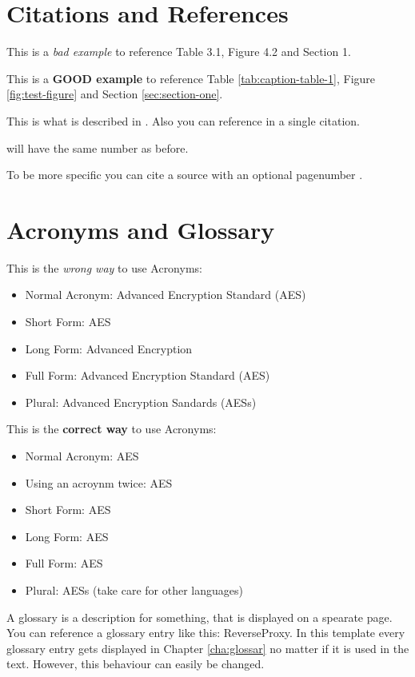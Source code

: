 \chapter{Citations and References}
\label{cha:citations-and-references}

This is a \textit{bad example} to reference Table 3.1, Figure 4.2 and Section 1.

This is a \textbf{GOOD example} to reference Table \ref{tab:caption-table-1}, Figure \ref{fig:test-figure} and Section \ref{sec:section-one}.

This is what is described in \cite{7516158}. Also you can reference \cite{siriwardena_advanced_2014, levin_restful_2016} in a single citation. 

\cite{7516158} will have the same number as before.

To be more specific you can cite a source with an optional pagenumber \cite[p. 17]{rfc:6838}.

\chapter{Acronyms and Glossary}
\label{sec:acronyms-and-glossary}

This is the \textit{wrong way} to use Acronyms: 
\begin{itemize}
    \item Normal Acronym: Advanced Encryption Standard (AES)
    \item Short Form: AES
    \item Long Form: Advanced Encryption
    \item Full Form: Advanced Encryption Standard (AES)
    \item Plural: Advanced Encryption Sandards (AESs)
\end{itemize}

This is the \textbf{correct way} to use Acronyms: 
\begin{itemize}
    \item Normal Acronym: \ac{AES}
    \item Using an acroynm twice: \ac{AES}
    \item Short Form: \acs{AES}
    \item Long Form: \acl{AES}
    \item Full Form: \acf{AES}
    \item Plural: \acfp{AES} (take care for other languages)
\end{itemize}

A glossary is a description for something, that is displayed on a spearate page. You can reference a glossary entry like this: \gls{ReverseProxy}. In this template every glossary entry gets displayed in Chapter \ref{cha:glossar} no matter if it is used in the text. However, this behaviour can easily be changed.


